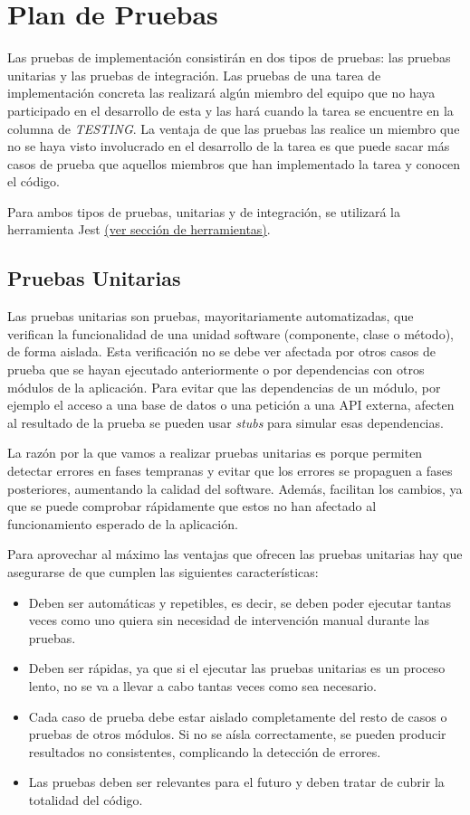 \section{Plan de Pruebas}
\label{cap:pruebas}
\nocite{pipelineRedHat}
\nocite{testingSW}
\nocite{ciAmazon}

Las pruebas de implementación consistirán en dos tipos de pruebas: las pruebas unitarias y las pruebas de integración. Las pruebas de una tarea de implementación concreta las realizará algún miembro del equipo que no haya participado en el desarrollo de esta y las hará cuando la tarea se encuentre en la columna de \textit{TESTING}. La ventaja de que las pruebas las realice un miembro que no se haya visto involucrado en el desarrollo de la tarea es que puede sacar más casos de prueba que aquellos miembros que han implementado la tarea y conocen el código.

Para ambos tipos de pruebas, unitarias y de integración, se utilizará la herramienta Jest \underline{(ver sección de herramientas)}.
\subsection{Pruebas Unitarias}
Las pruebas unitarias son pruebas, mayoritariamente automatizadas, que verifican la funcionalidad de una unidad software (componente, clase o método), de forma aislada. Esta verificación no se debe ver afectada por otros casos de prueba que se hayan ejecutado anteriormente o por dependencias con otros módulos de la aplicación. Para evitar que las dependencias de un módulo, por ejemplo el acceso a una base de datos o una petición a una API externa, afecten al resultado de la prueba se pueden usar \textit{stubs} para simular esas dependencias.

La razón por la que vamos a realizar pruebas unitarias es porque permiten detectar errores en fases tempranas y evitar que los errores se propaguen a fases posteriores, aumentando la calidad del software. Además, facilitan los cambios, ya que se puede comprobar rápidamente que estos no han afectado al funcionamiento esperado de la aplicación.

Para aprovechar al máximo las ventajas que ofrecen las pruebas unitarias hay que asegurarse de que cumplen las siguientes características:
\begin{itemize}
    \item Deben ser automáticas y repetibles, es decir, se deben poder ejecutar tantas veces como uno quiera sin necesidad de intervención manual durante las pruebas.
    \item Deben ser rápidas, ya que si el ejecutar las pruebas unitarias es un proceso lento, no se va a llevar a cabo tantas veces como sea necesario.
    \item Cada caso de prueba debe estar aislado completamente del resto de casos o pruebas de otros módulos. Si no se aísla correctamente, se pueden producir resultados no consistentes, complicando la detección de errores.
    \item Las pruebas deben ser relevantes para el futuro y deben tratar de cubrir la totalidad del código.
\end{itemize}
